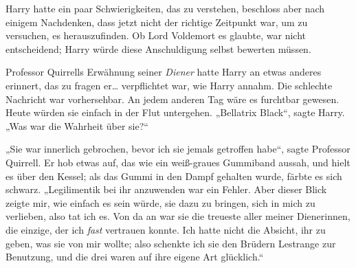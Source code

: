 Harry hatte ein paar Schwierigkeiten, das zu verstehen, beschloss aber nach einigem Nachdenken, dass jetzt nicht der richtige Zeitpunkt war, um zu versuchen, es herauszufinden. Ob Lord Voldemort es glaubte, war nicht entscheidend; Harry würde diese Anschuldigung selbst bewerten müssen.

Professor Quirrells Erwähnung seiner \emph{Diener} hatte Harry an etwas anderes erinnert, das zu fragen er… verpflichtet war, wie Harry annahm. Die schlechte Nachricht war vorhersehbar. An jedem anderen Tag wäre es furchtbar gewesen. Heute würden sie einfach in der Flut untergehen.
„Bellatrix Black“, sagte Harry. „Was war die Wahrheit über sie?“

„Sie war innerlich gebrochen, bevor ich sie jemals getroffen habe“, sagte Professor Quirrell. Er hob etwas auf, das wie ein weiß-graues Gummiband aussah, und hielt es über den Kessel; als das Gummi in den Dampf gehalten wurde, färbte es sich schwarz.
„Legilimentik bei ihr anzuwenden war ein Fehler. Aber dieser Blick zeigte mir, wie einfach es sein würde, sie dazu zu bringen, sich in mich zu verlieben, also tat ich es. Von da an war sie die treueste aller meiner Dienerinnen, die einzige, der ich \emph{fast} vertrauen konnte. Ich hatte nicht die Absicht, ihr zu geben, was sie von mir wollte; also schenkte ich sie den Brüdern Lestrange zur Benutzung, und die drei waren auf ihre eigene Art glücklich.“

